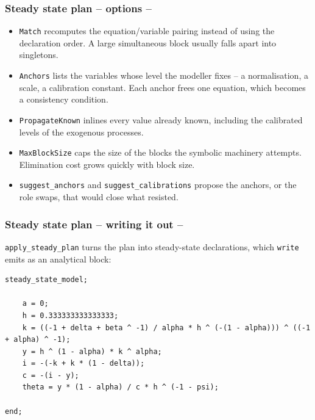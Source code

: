 \documentclass[10pt,slidestop]{beamer}
\theoremstyle{plain}
\begin{document}
\begin{frame}[c,fragile]
  \frametitle{Steady state plan -- options --}

  \begin{itemize}

  \item \verb+Match+ recomputes the equation/variable pairing instead of using
    the declaration order. A large simultaneous block usually falls apart into
    singletons.\newline

  \item \verb+Anchors+ lists the variables whose level the modeller fixes -- a
    normalisation, a scale, a calibration constant. Each anchor frees one
    equation, which becomes a consistency condition.\newline

  \item \verb+PropagateKnown+ inlines every value already known, including the
    calibrated levels of the exogenous processes.\newline

  \item \verb+MaxBlockSize+ caps the size of the blocks the symbolic machinery
    attempts. Elimination cost grows quickly with block size.\newline

  \item \verb+suggest_anchors+ and \verb+suggest_calibrations+ propose the
    anchors, or the role swaps, that would close what resisted.

  \end{itemize}

\end{frame}


\begin{frame}[c,fragile]
  \frametitle{Steady state plan -- writing it out --}

  \verb+apply_steady_plan+ turns the plan into steady-state declarations, which
  \verb+write+ emits as an analytical block:

  \bigskip

  \begin{lstlisting}[language=Dynare,basicstyle=\footnotesize\ttfamily,numbers=none]
steady_state_model;

	a = 0;
	h = 0.333333333333333;
	k = ((-1 + delta + beta ^ -1) / alpha * h ^ (-(1 - alpha))) ^ ((-1 + alpha) ^ -1);
	y = h ^ (1 - alpha) * k ^ alpha;
	i = -(-k + k * (1 - delta));
	c = -(i - y);
	theta = y * (1 - alpha) / c * h ^ (-1 - psi);

end;
  \end{lstlisting}

\end{frame}
\end{document}
